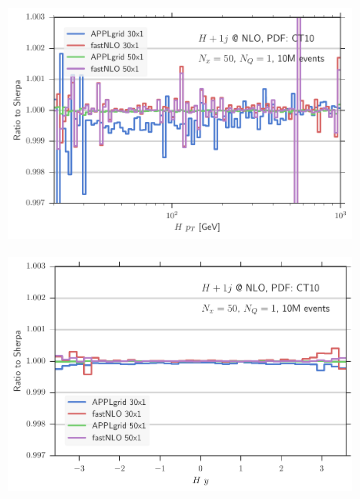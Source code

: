 \begin{figure}
\centering
\begin{subfigure}[]{0.49\textwidth}
	\includegraphics[width=\textwidth]{images/hjnlo_hpt_50v30.pdf}
\end{subfigure}
\hfill
\begin{subfigure}[]{0.49\textwidth}
	\includegraphics[width=\textwidth]{images/hjnlo_hy_50v30.pdf}
\end{subfigure}


\end{figure}
